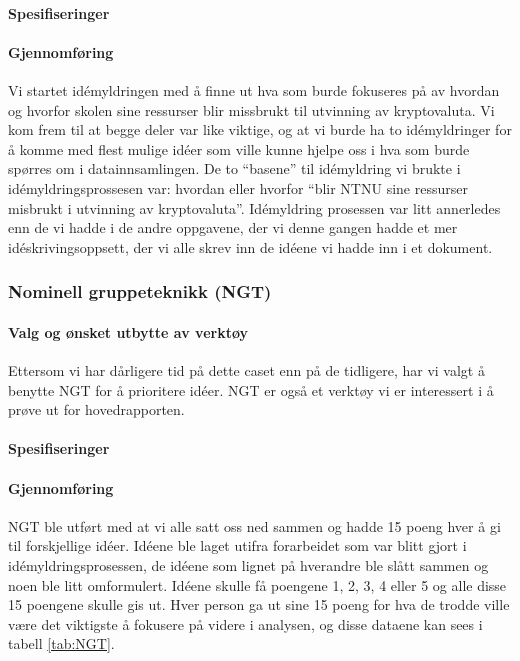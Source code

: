 \paragraph{Spesifiseringer}


\paragraph{Gjennomføring}
Vi startet idémyldringen med å finne ut hva som burde fokuseres på av hvordan og hvorfor skolen sine ressurser blir missbrukt til utvinning av kryptovaluta. Vi kom frem til at begge deler var like viktige, og at vi burde ha to idémyldringer for å komme med flest mulige idéer som ville kunne hjelpe oss i hva som burde spørres om i datainnsamlingen. De to ``basene'' til idémyldring vi brukte i idémyldringsprossesen var: hvordan eller hvorfor ``blir NTNU sine ressurser misbrukt i utvinning av kryptovaluta''. Idémyldring prosessen var litt annerledes enn de vi hadde i de andre oppgavene, der vi denne gangen hadde et mer idéskrivingsoppsett, der vi alle skrev inn de idéene vi hadde inn i et dokument.


\subsubsection{Nominell gruppeteknikk (NGT)}
\paragraph{Valg og ønsket utbytte av verktøy}
Ettersom vi har dårligere tid på dette caset enn på de tidligere, har vi valgt å benytte NGT for å prioritere idéer. NGT er også et verktøy vi er interessert i å prøve ut for hovedrapporten.
\paragraph{Spesifiseringer}


\paragraph{Gjennomføring}
NGT ble utført med at vi alle satt oss ned sammen og hadde 15 poeng hver å gi til forskjellige idéer. Idéene ble laget utifra forarbeidet som var blitt gjort i idémyldringsprosessen, de idéene som lignet på hverandre ble slått sammen og noen ble litt omformulert. Idéene skulle få poengene 1, 2, 3, 4 eller 5 og alle disse 15 poengene skulle gis ut. Hver person ga ut sine 15 poeng for hva de trodde ville være det viktigste å fokusere på videre i analysen, og disse dataene kan sees i tabell \ref{tab:NGT}.

